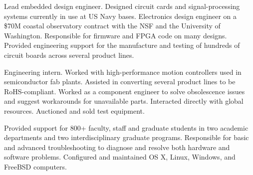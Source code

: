 \documentclass[letterpaper, 10pt]{article}
\begin{document}
{\noindent \begin{minipage}[t]{0.45\textwidth}%
\par \smallskip \begin{spacing}{0.5}%
%
\par%
\par \smallskip \smallskip
Lead embedded design engineer. Designed circuit cards and signal-processing systems currently in use at US Navy bases. Electronics design engineer on a \$70M coastal observatory contract with the NSF and the University of Washington. Responsible for firmware and FPGA code on many designs. Provided engineering support for the manufacture and testing of hundreds of circuit boards across several product lines.
\par\bigskip
%
\par \smallskip \smallskip
Engineering intern. Worked with high-performance motion controllers used in semiconductor fab plants. Assisted in converting several product lines to be RoHS-compliant. Worked as a component engineer to solve obsolescence issues and suggest workarounds for unavailable parts. Interacted
directly with global resources. Auctioned and sold test equipment.
\par\bigskip
%
\par \smallskip \smallskip
Provided support for 800+ faculty, staff and graduate students in two academic departments and two interdisciplinary graduate programs. Responsible for basic and advanced troubleshooting to diagnose and resolve both hardware and software problems. Configured and maintained OS X, Linux, Windows, and FreeBSD computers.
\par\bigskip
%
\par
{}
\par \smallskip \smallskip

\end{spacing}
\end{minipage}}
\end{document}
